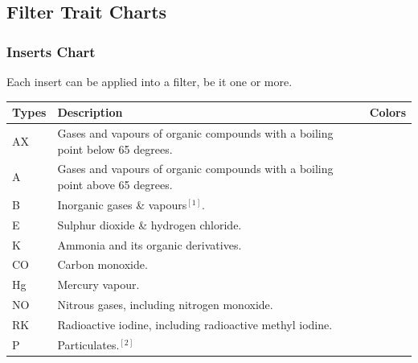 \documentclass[a4paper, 12pt, oneside]{article}
\begin{document}
{		\subsection{Filter Trait Charts}
			\subsubsection{Inserts Chart}
				Each insert can be applied into a filter, be it one or more.
				\begin{tabular}{|p{1cm}||p{10cm}|p{1.57cm}|}
					\hline
					Types & Description & Colors \\\hline
					AX & Gases and vapours of organic compounds with a boiling point below 65 degrees. & \cellcolor[HTML]{995000} \\
					A & Gases and vapours of organic compounds with a boiling point above 65 degrees. & \cellcolor[HTML]{997000} \\
					B & Inorganic gases \& vapours$^{[1]}$. & \cellcolor[HTML]{CACACA} \\
					E & Sulphur dioxide \& hydrogen chloride. & \cellcolor[HTML]{CCBB00} \\
					K & Ammonia and its organic derivatives. & \cellcolor[HTML]{00AA00} \\
					CO & Carbon monoxide. & \cellcolor[HTML]{000000} \\
					Hg & Mercury vapour. & \cellcolor[HTML]{990000} \\
					NO & Nitrous gases, including nitrogen monoxide. & \cellcolor[HTML]{0000BB} \\
					RK & Radioactive iodine, including radioactive methyl iodine. & \cellcolor[HTML]{E96000} \\
					P & Particulates.$^{[2]}$ & \cellcolor[HTML]{424242} \\\hline
				\end{tabular} \-\\
}
\end{document}
